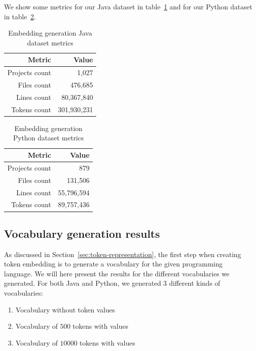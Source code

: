 We show some metrics for our Java dataset in
table~\ref{tab:java-embedding-dataset} and for our Python dataset in
table~\ref{tab:python-embedding-dataset}.

\begin{table}
  \caption{\label{tab:java-embedding-dataset}Embedding generation Java dataset
    metrics}
  \begin{center}
    \begin{tabular}{r r}
      \toprule
      Metric & Value\\
      \toprule
      Projects count & 1,027\\
      Files count & 476,685\\
      Lines count & 80,367,840\\
      Tokens count & 301,930,231\\
      \bottomrule
    \end{tabular}
  \end{center}
\end{table}

\begin{table}
  \caption{\label{tab:python-embedding-dataset}Embedding generation Python
    dataset metrics}
  \begin{center}
    \begin{tabular}{r r}
      \toprule
      Metric & Value\\
      \toprule
      Projects count & 879\\
      Files count & 131,506\\
      Lines count & 55,796,594\\
      Tokens count & 89,757,436\\
      \bottomrule
    \end{tabular}
  \end{center}
\end{table}

\subsection{Vocabulary generation results}
As discussed in Section~\ref{sec:token-representation}, the first step when
creating token embedding is to generate a vocabulary for the given programming
language. We will here present the results for the different vocabularies we
generated. For both Java and Python, we generated 3 different kinds of
vocabularies:

\begin{enumerate}
\item Vocabulary without token values
\item Vocabulary of $500$ tokens with values
\item Vocabulary of $10000$ tokens with values
\end{enumerate}

